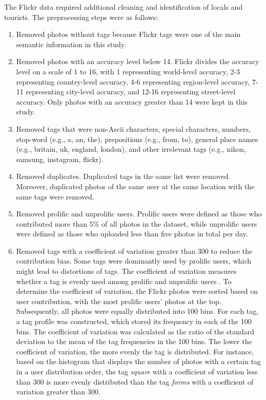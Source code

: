 \documentclass{article}
\theoremstyle{definition}
\theoremstyle{remark}
\begin{document}
The Flickr data required additional cleaning and identification of locals and tourists. The preprocessing steps were as follows:
\begin{enumerate}
    \item Removed photos without tags because Flickr tags were one of the main semantic information in this study.
    \item Removed photos with an accuracy level below 14. Flickr divides the accuracy level on a scale of 1 to 16, with 1 representing world-level accuracy, 2-3 representing country-level accuracy, 4-6 representing region-level accuracy, 7-11 representing city-level accuracy, and 12-16 representing street-level accuracy. Only photos with an accuracy greater than 14 were kept in this study.
    \item Removed tags that were non-Ascii characters, special characters, numbers, stop-word (e.g., a, an, the), prepositions (e.g., from, to), general place names (e.g., britain, uk, england, london), and other irrelevant tags (e.g., nikon, samsung, instagram, flickr).
    \item Removed duplicates. Duplicated tags in the same list were removed. Moreover, duplicated photos of the same user at the same location with the same tags were removed.
    \item Removed prolific and unprolific users. Prolific users were defined as those who contributed more than 5\% of all photos in the dataset, while unprolific users were defined as those who uploaded less than five photos in total per day.
    \item Removed tags with a coefficient of variation greater than 300 to reduce the contribution bias. Some tags were dominantly used by prolific users, which might lead to distortions of tags. The coefficient of variation measures whether a tag is evenly used among prolific and unprolific users \cite{hollenstein_exploring_2010}. To determine the coefficient of variation, the Flickr photos were sorted based on user contribution, with the most prolific users' photos at the top. Subsequently, all photos were equally distributed into 100 bins. For each tag, a tag profile was constructed, which stored its frequency in each of the 100 bins. The coefficient of variation was calculated as the ratio of the standard deviation to the mean of the tag frequencies in the 100 bins. The lower the coefficient of variation, the more evenly the tag is distributed. For instance, based on the histogram that displays the number of photos with a certain tag in a user distribution order, the tag \textit{square} with a coefficient of variation less than 300 is more evenly distributed than the tag \textit{forms} with a coefficient of variation greater than 300.

\end{enumerate}
\end{document}
